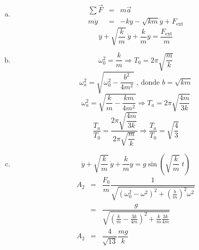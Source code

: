 \begin{enumerate}[a)]
	\item 
	\begin{eqnarray*}
	\sum \vec{F} &=& m \vec{a} \\
	m \ddot{y} &=& -ky - \sqrt{km} \dot{y} + F_{\text{ext}}
	\end{eqnarray*}
	\begin{equation*}
	\ddot{y} + \sqrt{\dfrac{k}{m}}\ \dot{y} + \dfrac{k}{m}y = \dfrac{F_{\text{ext}}}{m}
	\end{equation*}
	
	\item 
	\begin{equation*}
	\omega_0^2 = \dfrac{k}{m} \Longrightarrow T_0 = 2 \pi \sqrt{\dfrac{m}{k}} 
	\end{equation*}
	\begin{equation*}
	\omega_a^2 = \sqrt{\omega_0^2 - \dfrac{b^2}{4m^2}} \text{ , donde } b=\sqrt{km}
	\end{equation*}
	\begin{equation*}
	\omega_a^2 = \sqrt{\dfrac{k}{m} - \dfrac{km}{4m^2}} \Longrightarrow T_a = 2 \pi \sqrt{\dfrac{4m}{3k}}
	\end{equation*}
	\begin{equation*}
	\dfrac{T_a}{T_0} = \dfrac{2 \pi \sqrt{\dfrac{4m}{3k}}}{2 \pi \sqrt{\dfrac{m}{k}}} \Longrightarrow \dfrac{T_a}{T_0} = \sqrt{\dfrac{4}{3}}
	\end{equation*}
	
	\item 
	\begin{equation*}
	\ddot{y} + \sqrt{\dfrac{k}{m}}\ \dot{y} + \dfrac{k}{m}y = g \sin \left( \sqrt{\frac{k}{m}} \ t \right)
	\end{equation*}
	\begin{eqnarray*}
		A_2 &=& \dfrac{F_0}{m} \dfrac{1}{\sqrt{\left( \omega_0^2 - \omega^2\right)^2 + \left( \frac{b}{m} \right)^2 \omega^2 }} \\
		&=& \dfrac{g}{\sqrt{\left( \frac{k}{m} - \frac{3k}{4m} \right)^2 + \frac{k}{m} \frac{3k}{4m} }} \\
		A_2 &=& \dfrac{4}{\sqrt{13}} \dfrac{mg}{k}
	\end{eqnarray*}		
\end{enumerate}